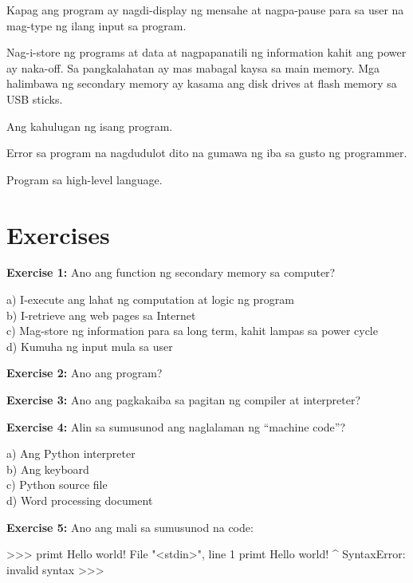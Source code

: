 \documentclass[10pt,]{book}
\newenvironment{Shaded}{}{}
\newcommand{\DecValTok}[1]{\textcolor[rgb]{0.25,0.63,0.44}{#1}}
\newcommand{\NormalTok}[1]{#1}
\newcommand{\OperatorTok}[1]{\textcolor[rgb]{0.40,0.40,0.40}{#1}}
\newcommand{\PreprocessorTok}[1]{\textcolor[rgb]{0.74,0.48,0.00}{#1}}
\newcommand{\StringTok}[1]{\textcolor[rgb]{0.25,0.44,0.63}{#1}}
\begin{document}
\begin{description}
Kapag ang program ay nagdi-display ng mensahe at nagpa-pause para sa
user na mag-type ng ilang input sa program. 
\item[secondary memory]
Nag-i-store ng programs at data at nagpapanatili ng information kahit
ang power ay naka-off. Sa pangkalahatan ay mas mabagal kaysa sa main
memory. Mga halimbawa ng secondary memory ay kasama ang disk drives at
flash memory sa USB sticks. 
\item[semantics]
Ang kahulugan ng isang program. 
\item[semantic error]
Error sa program na nagdudulot dito na gumawa ng iba sa gusto ng
programmer. 
\item[source code]
Program sa high-level language. 
\end{description}

\section{Exercises}\label{exercises}

\textbf{Exercise 1:} Ano ang function ng secondary memory sa computer?

a) I-execute ang lahat ng computation at logic ng program\\
b) I-retrieve ang web pages sa Internet\\
c) Mag-store ng information para sa long term, kahit lampas sa power
cycle\\
d) Kumuha ng input mula sa user

\textbf{Exercise 2:} Ano ang program?

\textbf{Exercise 3:} Ano ang pagkakaiba sa pagitan ng compiler at
interpreter?

\textbf{Exercise 4:} Alin sa sumusunod ang naglalaman ng ``machine
code''?

a) Ang Python interpreter\\
b) Ang keyboard\\
c) Python source file\\
d) Word processing document

\textbf{Exercise 5:} Ano ang mali sa sumusunod na code:

\begin{Shaded}
\begin{Highlighting}[]
\OperatorTok{\textgreater{}\textgreater{}\textgreater{}}\NormalTok{ primt }\StringTok{\textquotesingle{}Hello world!\textquotesingle{}}
\NormalTok{File }\StringTok{"\textless{}stdin\textgreater{}"}\NormalTok{, line }\DecValTok{1}
\NormalTok{  primt }\StringTok{\textquotesingle{}Hello world!\textquotesingle{}}
                     \OperatorTok{\^{}}
\PreprocessorTok{SyntaxError}\NormalTok{: invalid syntax}
\OperatorTok{\textgreater{}\textgreater{}\textgreater{}}
\end{Highlighting}
\end{Shaded}
\end{document}
